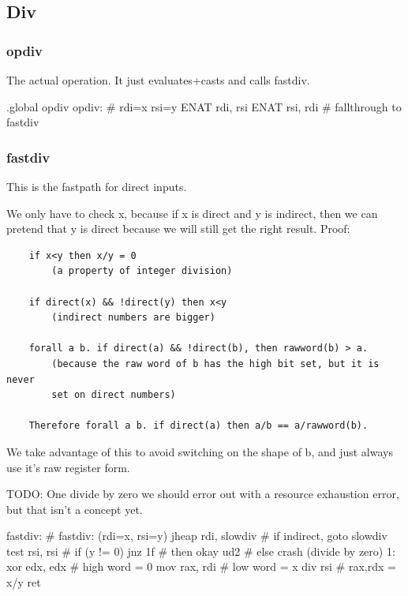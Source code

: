 \subsection{Div}
\subsubsection{opdiv}

The actual operation.  It just evaluates+casts and calls fastdiv.

\begin{asm}
.global opdiv
opdiv: # rdi=x rsi=y
	ENAT	rdi, rsi
	ENAT	rsi, rdi
	# fallthrough to fastdiv
\end{asm}

\subsubsection{fastdiv}

This is the fastpath for direct inputs.

We only have to check x, because if x is direct and y is indirect, then
we can pretend that y is direct because we will still get the right
result. Proof:

\begin{verbatim}
    if x<y then x/y = 0
        (a property of integer division)

    if direct(x) && !direct(y) then x<y
        (indirect numbers are bigger)

    forall a b. if direct(a) && !direct(b), then rawword(b) > a.
        (because the raw word of b has the high bit set, but it is never
        set on direct numbers)

    Therefore forall a b. if direct(a) then a/b == a/rawword(b).
\end{verbatim}

We take advantage of this to avoid switching on the shape of b, and just
always use it's raw register form.

TODO: One divide by zero we should error out with a resource exhaustion
error, but that isn't a concept yet.

\begin{asm}
fastdiv:                     # fastdiv: (rdi=x, rsi=y)
	jheap	rdi, slowdiv #   if indirect, goto slowdiv
	test	rsi, rsi     #   if (y != 0)
	jnz	1f           #     then okay
	ud2                  #     else crash (divide by zero)
1:	xor	edx, edx     #   high word = 0
	mov	rax, rdi     #   low word = x
	div	rsi          #   rax,rdx = x/y
	ret
\end{asm}

